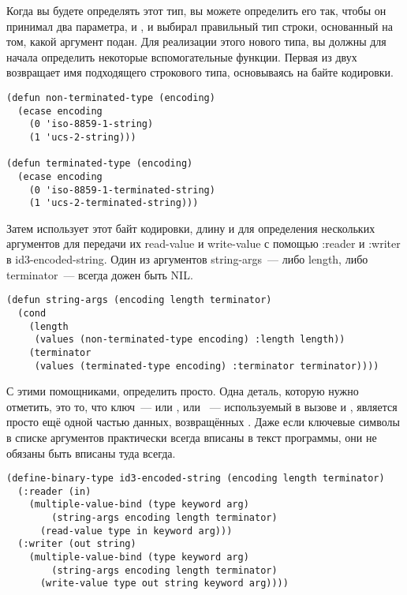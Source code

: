 Когда вы будете определять этот тип, вы можете определить его так, чтобы он принимал два
параметра,  и , и выбирал правильный тип строки,
основанный на том, какой аргумент подан. Для реализации этого нового типа, вы должны для
начала определить некоторые вспомогательные функции. Первая из двух возвращает имя
подходящего строкового типа, основываясь на байте кодировки.

\begin{lstlisting}
(defun non-terminated-type (encoding)
  (ecase encoding
    (0 'iso-8859-1-string)
    (1 'ucs-2-string)))

(defun terminated-type (encoding)
  (ecase encoding
    (0 'iso-8859-1-terminated-string)
    (1 'ucs-2-terminated-string)))
\end{lstlisting}

Затем  использует этот байт кодировки, длину и  для
определения нескольких аргументов для передачи их read-value и write-value с помощью
:reader и :writer в id3-encoded-string. Один из аргументов string-args~--- либо length,
либо terminator~--- всегда дожен быть NIL.

\begin{lstlisting}
(defun string-args (encoding length terminator)
  (cond 
    (length
     (values (non-terminated-type encoding) :length length))
    (terminator
     (values (terminated-type encoding) :terminator terminator))))
\end{lstlisting}

С этими помощниками, определить  просто. Одна деталь, которую
нужно отметить, это то, что ключ~--- или , или ~---
используемый в вызове  и , является просто ещё одной
частью данных, возвращённых . Даже если ключевые символы в списке
аргументов практически всегда вписаны в текст программы, они не обязаны быть вписаны туда
всегда.

\begin{lstlisting}
(define-binary-type id3-encoded-string (encoding length terminator)
  (:reader (in) 
    (multiple-value-bind (type keyword arg)
        (string-args encoding length terminator)
      (read-value type in keyword arg)))
  (:writer (out string)
    (multiple-value-bind (type keyword arg)
        (string-args encoding length terminator)
      (write-value type out string keyword arg))))
\end{lstlisting}

